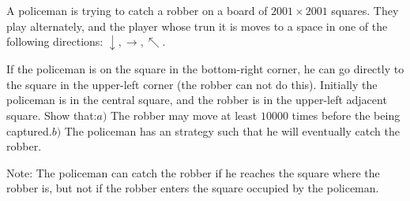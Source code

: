 A policeman is trying to catch a robber on a board of $2001\times2001$ squares. They play alternately, and the player whose trun it is moves to a space in one of the following directions: $\downarrow,\rightarrow,\nwarrow$.

If the policeman is on the square in the bottom-right corner, he can go directly to the square in the upper-left corner (the robber can not do this). Initially the policeman is in the central square, and the robber is in the upper-left adjacent square. Show that:$a)$ The robber may move at least $10000$ times before the being captured.$b)$ The policeman has an strategy such that he will eventually catch the robber.

Note: The policeman can catch the robber if he reaches the square where the robber is, but not if the robber enters the square occupied by the policeman.